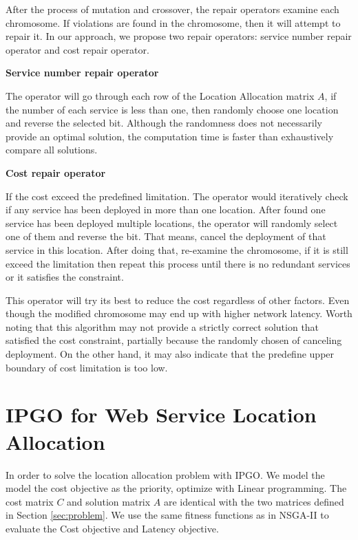 \documentclass{llncs}
\begin{document}
After the process of mutation and crossover, the repair operators examine each chromosome. 
If violations are found in the chromosome, then it will attempt to repair it. 
In our approach, we propose two repair operators: service number repair operator and cost repair operator.

\begin{flushleft}\textbf{Service number repair operator}\end{flushleft}
The operator will go through each row of the Location Allocation matrix $A$, if the number of each 
service is less than one, then randomly choose one location and reverse the selected bit. 
Although the randomness does not necessarily provide an optimal solution, the computation time is 
faster than exhaustively compare all solutions. 


\begin{flushleft}\textbf{Cost repair operator}\end{flushleft}
If the cost exceed the predefined limitation. The operator would iteratively check if any service has 
been deployed in more than one location. After found one service has been deployed multiple locations, 
the operator will randomly select one of them and reverse the bit. That means, cancel the deployment of 
that service in this location. After doing that, re-examine the chromosome, if it is still exceed the 
limitation then repeat this process until there is no redundant services or it satisfies the constraint.

This operator will try its best to reduce the cost regardless of other factors. Even though the modified 
chromosome may end up with higher network latency.
Worth noting that this algorithm may not provide a strictly correct solution that satisfied the cost constraint, 
partially because the randomly chosen of canceling deployment. On the other hand, it may also indicate that 
the predefine upper boundary of cost limitation is too low.

\section{IPGO for Web Service Location Allocation}
In order to solve the location allocation problem with IPGO. We model the model the cost objective as the priority, optimize with Linear programming.
The cost matrix $C$ and solution matrix $A$ are identical with the two matrices defined in Section \ref{sec:problem}. We use the same fitness functions as in NSGA-II to 
evaluate the Cost objective and Latency objective.
\end{document}
